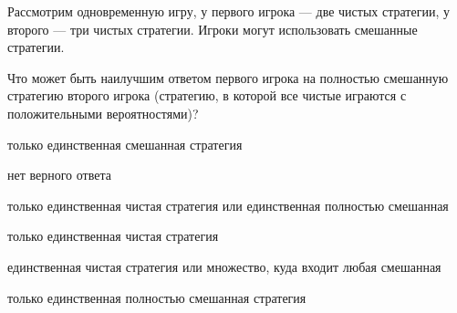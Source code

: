 
\begin{question}
Рассмотрим одновременную игру, у первого игрока --- две чистых стратегии,
у второго --- три чистых стратегии. Игроки могут использовать смешанные стратегии.

Что может быть наилучшим ответом первого игрока на полностью смешанную стратегию второго игрока (стратегию, в которой все чистые играются с положительными вероятностями)?
\begin{answerlist}
  \item только единственная смешанная стратегия
  \item нет верного ответа
  \item только единственная чистая стратегия или единственная полностью смешанная
  \item только единственная чистая стратегия
  \item единственная чистая стратегия или множество, куда входит любая смешанная
  \item только единственная полностью смешанная стратегия
\end{answerlist}
\end{question}


